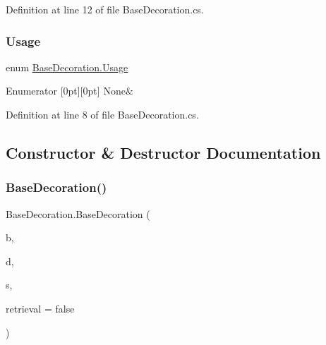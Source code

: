 Definition at line 12 of file Base\+Decoration.\+cs.

\mbox{\label{class_base_decoration_ad8b9ff9e5d7dc488ca94fed2efa45a6e}} 
\subsubsection{\texorpdfstring{Usage}{Usage}}
{\footnotesize\ttfamily enum \mbox{\hyperlink{class_base_decoration_ad8b9ff9e5d7dc488ca94fed2efa45a6e}{Base\+Decoration.\+Usage}}\hspace{0.3cm}{\ttfamily [strong]}}

\begin{DoxyEnumFields}{Enumerator}
[0pt][0pt]{}\mbox{\label{class_base_decoration_ad8b9ff9e5d7dc488ca94fed2efa45a6ea6adf97f83acf6453d4a6a4b1070f3754}} 
None&\\
\hline

\end{DoxyEnumFields}


Definition at line 8 of file Base\+Decoration.\+cs.



\subsection{Constructor \& Destructor Documentation}
\mbox{\label{class_base_decoration_a75dae0a3df64d463e98ba2bdeed02265}} 
\subsubsection{\texorpdfstring{BaseDecoration()}{BaseDecoration()}}
{\footnotesize\ttfamily Base\+Decoration.\+Base\+Decoration (\begin{DoxyParamCaption}\item[{\mbox{\hyperlink{class_biome}{Biome}}}]{b,  }\item[{\mbox{\hyperlink{class_base_decoration_a8adb8095439bd24fd3c2058b2ecbbf11}{Decoration\+Type}}}]{d,  }\item[{\mbox{\hyperlink{class_sprite_manager}{Sprite\+Manager}}}]{s,  }\item[{bool}]{retrieval = {\ttfamily false} }\end{DoxyParamCaption})}



